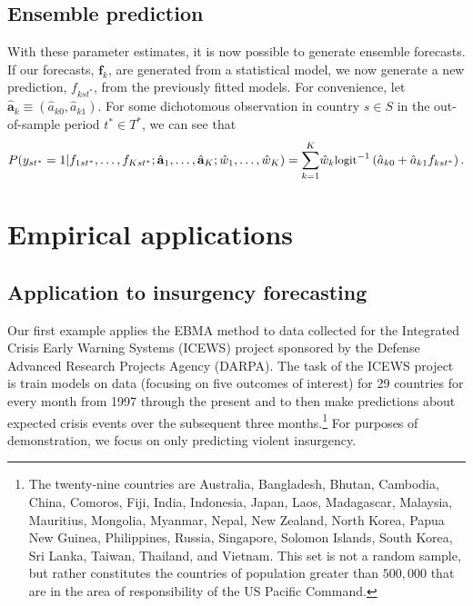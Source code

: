 \documentclass[pdftex,12pt,fullpage,oneside]{amsart}
\begin{document}
\subsection{Ensemble prediction}

With these parameter estimates, it is now possible to generate
ensemble forecasts. If our forecasts, $\mathbf{f}_k$, are generated
from a statistical model, we now generate a new prediction,
$f_{kst^\ast}$, from the previously fitted models. For convenience,
let $\hat{\mathbf{a}}_k \equiv (\hat{a}_{k0}, \hat{a}_{k1})$. For some
dichotomous observation in country $s\in S$ in the out-of-sample
period $t^\ast\in T^\ast$, we can see that
\begin{equation}
\label{nothing}
{\small
P(y_{st^*} = 1 | f_{1st^\ast}, \ldots, f_{Kst^\ast} ;  \hat{\mathbf{a}}_1,
 \ldots, \hat{\mathbf{a}}_K ; \hat{w}_1, \ldots, \hat{w}_K) =
 \overset{K}{\underset{k=1}{\sum}} \hat{w}_k
 \mbox{logit}^{-1}\left(\hat{a}_{k0} +  \hat{a}_{k1}f_{kst^\ast}\right).}
\end{equation}



\section{Empirical applications}

\subsection{Application to insurgency forecasting}

Our first example applies the EBMA method to data collected for the
Integrated Crisis Early Warning Systems (ICEWS) project sponsored by
the Defense Advanced Research Projects Agency (DARPA).  The task of
the ICEWS project is train models on data (focusing on five outcomes
of interest) for 29 countries for every month from 1997 through the
present and to then make predictions about expected crisis events over
the subsequent three months.\footnote{The twenty-nine countries are
  Australia, Bangladesh, Bhutan, Cambodia, China, Comoros, Fiji,
  India, Indonesia, Japan, Laos, Madagascar, Malaysia, Mauritius,
  Mongolia, Myanmar, Nepal, New Zealand, North Korea, Papua New
  Guinea, Philippines, Russia, Singapore, Solomon Islands, South
  Korea, Sri Lanka, Taiwan, Thailand, and Vietnam. This set is not a
  random sample, but rather constitutes the countries of population
  greater than $500,000$ that are in the area of responsibility of the
  US Pacific Command.}  For purposes of demonstration, we focus on
only predicting violent insurgency.
\end{document}
